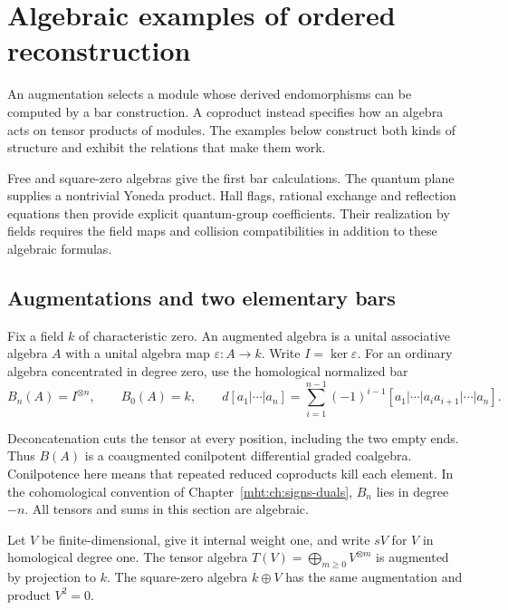 \chapter{Algebraic examples of ordered reconstruction}
\label{ch:algebraic-reconstruction-examples}

An augmentation selects a module whose derived endomorphisms can be computed by a bar construction.
A coproduct instead specifies how an algebra acts on tensor products of modules.
The examples below construct both kinds of structure and exhibit the relations that make them work.

Free and square-zero algebras give the first bar calculations. The quantum plane supplies a nontrivial Yoneda product.
Hall flags, rational exchange and reflection equations then provide explicit quantum-group coefficients.
Their realization by fields requires the field maps and collision compatibilities in addition to these algebraic formulas.

\section{Augmentations and two elementary bars}

Fix a field $k$ of characteristic zero.
An augmented algebra is a unital associative algebra $A$ with a unital algebra map
$\varepsilon:A\to k$. Write $I=\ker\varepsilon$.
For an ordinary algebra concentrated in degree zero, use the homological normalized bar
\[
 B_n(A)=I^{\otimes n},\qquad B_0(A)=k,
 \qquad
 d[a_1|\cdots|a_n]
 =\sum_{i=1}^{n-1}(-1)^{i-1}
 [a_1|\cdots|a_i a_{i+1}|\cdots|a_n].
\]

Deconcatenation cuts the tensor at every position, including the two empty ends.
Thus $B(A)$ is a coaugmented conilpotent differential graded coalgebra.
Conilpotence here means that repeated reduced coproducts kill each element.
In the cohomological convention of Chapter~\ref{mht:ch:signs-duals}, $B_n$ lies in degree $-n$.
All tensors and sums in this section are algebraic.

Let $V$ be finite-dimensional, give it internal weight one, and write $sV$ for $V$ in homological degree one.
The tensor algebra $T(V)=\bigoplus_{m\ge0}V^{\otimes m}$ is augmented by projection to $k$.
The square-zero algebra $k\oplus V$ has the same augmentation and product $V^2=0$.

